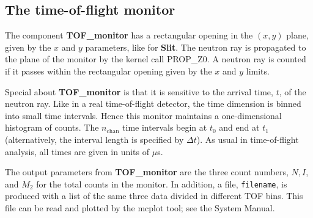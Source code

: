 \subsection*{The time-of-flight monitor}

The component \textbf{TOF\_monitor} has a rectangular opening
in the $(x,y)$ plane, given by the $x$ and $y$ parameters,
like for \textbf{Slit}.
The neutron ray is propagated to the plane of the monitor
by the kernel call PROP\_Z0.
A neutron ray is counted if it passes within the rectangular opening
given by the $x$ and $y$ limits.

Special about \textbf{TOF\_monitor} is that it is sensitive to
the arrival time, $t$, of the neutron ray.
Like in a real time-of-flight detector, the time dimension is
binned into small time intervals.
Hence this monitor maintains a one-dimensional histogram of counts.
The $n_\textrm{chan}$ time intervals begin at $t_0$ and
end at $t_1$ (alternatively, the interval length is specified by $\Delta t$).
As usual in time-of-flight analysis, all times are given in units of $\mu$s.

The output parameters from \textbf{TOF\_monitor} are the three count numbers,
$N, I$, and $M_2$ for the total counts in the monitor.
In addition, a file, \verb+filename+, is produced with a list of
the same three data divided in different TOF bins.
This file can be read and plotted by the \textrm{mcplot} tool; see the
System Manual.

